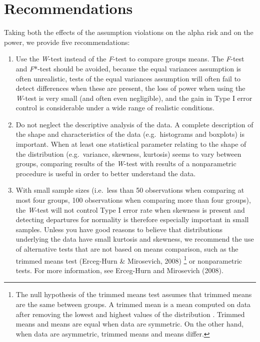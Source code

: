 \documentclass[man,floatsintext]{apa6}
\providecommand{\tightlist}{%
  \setlength{\itemsep}{0pt}\setlength{\parskip}{0pt}}
\let\rmarkdownfootnote\footnote%
\def\footnote{\protect\rmarkdownfootnote}
\begin{document}
\hypertarget{recommendations}{%
\section{Recommendations}\label{recommendations}}

Taking both the effects of the assumption violations on the alpha risk and on the power, we provide five recommendations:

\begin{enumerate}
\def\labelenumi{\arabic{enumi}.}
\tightlist
\item
  Use the \emph{W}-test instead of the \emph{F}-test to compare groups means. The \emph{F}-test and \emph{F}*-test should be avoided, because the equal variances assumption is often unrealistic, tests of the equal variances assumption will often fail to detect differences when these are present, the loss of power when using the \emph{W}-test is very small (and often even negligible), and the gain in Type I error control is considerable under a wide range of realistic conditions.
\item
  Do not neglect the descriptive analysis of the data. A complete description of the shape and characteristics of the data (e.g.~histograms and boxplots) is important. When at least one statistical parameter relating to the shape of the distribution (e.g.~variance, skewness, kurtosis) seems to vary between groups, comparing results of the \emph{W}-test with results of a nonparametric procedure is useful in order to better understand the data.\\
\item
  With small sample sizes (i.e.~less than 50 observations when comparing at most four groups, 100 observations when comparing more than four groups), the \emph{W}-test will not control Type I error rate when skewness is present and detecting departures for normality is therefore especially important in small samples. Unless you have good reasons to believe that distributions underlying the data have small kurtosis and skewness, we recommend the use of alternative tests that are not based on means comparison, such as the trimmed means test (Erceg-Hurn \& Mirosevich, 2008) \footnote{The null hypothesis of the trimmed means test assumes that trimmed means are the same between groups. A trimmed mean is a mean computed on data after removing the lowest and highest values of the distribution . Trimmed means and means are equal when data are symmetric. On the other hand, when data are asymmetric, trimmed means and means differ.} or nonparametric tests. For more information, see Erceg-Hurn and Mirosevich (2008).

\end{enumerate}
\end{document}
